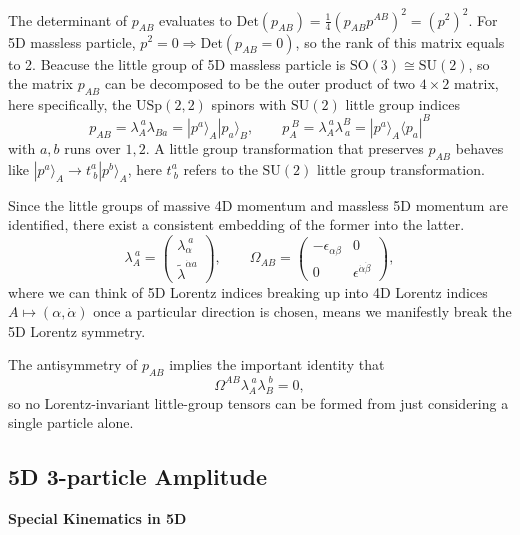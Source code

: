 \documentclass[12pt]{article}
\newcommand{\aket}[1]{|#1\rangle}
\newcommand{\abra}[1]{\langle #1|}
\begin{document}
The determinant of $p_{AB}$ evaluates to $\mathrm{Det}(p_{AB})=\frac{1}{4}(p_{AB}p^{AB})^2=(p^2)^2$. For 5D massless particle, $p^2=0 \Rightarrow \mathrm{Det}(p_{AB}=0)$, so the rank of this matrix equals to 2. Beacuse the little group of 5D massless particle is $\mathrm{SO}(3)\cong \mathrm{SU}(2)$, so the matrix $p_{AB}$ can be decomposed to be the outer product of two $4\times 2$ matrix, here specifically, the $\mathrm{USp}(2,2)$ spinors with $\mathrm{SU}(2)$ little group indices
\begin{equation}
    p_{AB}=\lambda_A^{\ a}\lambda_{Ba}=\aket{p^a}_A\aket{p_a}_B,\qquad p_A^{\ B}=\lambda_A^{\ a}\lambda^B_{\ a}=\aket{p^a}_A\abra{p_a}^B
\end{equation}
with $a,b$ runs over $1,2$. A little group transformation that preserves $p_{AB}$ behaves like $\aket{p^a}_A \rightarrow t^a_{\ b} \aket{p^b}_A$, here $t^a_{\ b}$ refers to the $\mathrm{SU}(2)$ little group transformation. 

\hspace*{2em}Since the little groups of massive 4D momentum and massless 5D momentum are identified, there exist a consistent embedding of the former into the latter.
\begin{equation}
    \lambda_A^{\ a} = 
    \begin{pmatrix}
        \lambda_\alpha^{\;a} \\
        \tilde{\lambda}^{\dot{\alpha} a}
    \end{pmatrix},
    \qquad
    \Omega_{AB} = 
    \begin{pmatrix}
        -\epsilon_{\alpha\beta} & 0 \\
        0 & \epsilon^{\dot{\alpha}\dot{\beta}}
    \end{pmatrix},
\end{equation}
where we can think of 5D Lorentz indices breaking up into 4D Lorentz indices 
\( A \mapsto (\alpha, \dot{\alpha}) \) once a particular direction is chosen, means we manifestly break the 5D Lorentz symmetry. 

The antisymmetry of \( p_{AB} \) implies the important identity that 
\begin{equation}
    \Omega^{AB} \lambda_A^{\;a} \lambda_B^{\;b} = 0,
\end{equation}
so no Lorentz-invariant little-group tensors can be formed from just 
considering a single particle alone.

\subsection{5D 3-particle Amplitude}
\noindent
\textbf{Special Kinematics in 5D}
\end{document}
